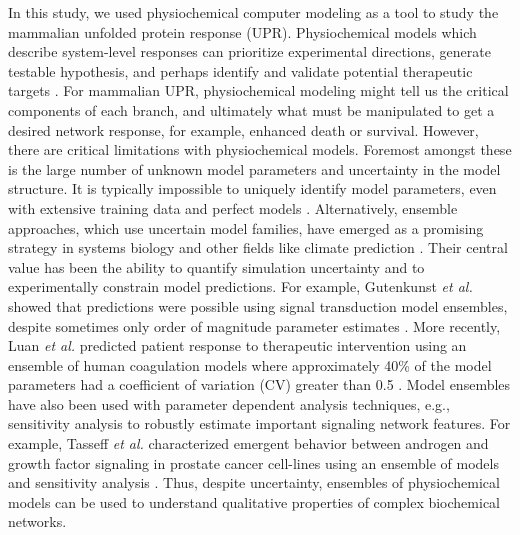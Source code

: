 \documentclass[fleqn,10pt]{wlscirep}
\begin{document}
In this study, we used physiochemical computer modeling as a tool to study the mammalian unfolded protein response (UPR).
Physiochemical models which describe system-level responses can prioritize experimental directions, generate testable hypothesis, and perhaps identify and validate potential therapeutic targets \cite{KITANO2007}.
For mammalian UPR, physiochemical modeling might tell us the critical components of each branch, and ultimately what must be manipulated to get a desired network response, for example, enhanced death or survival.
However, there are critical limitations with physiochemical models. Foremost amongst these is the large number of unknown model parameters and uncertainty in the model structure.
It is typically impossible to uniquely identify model parameters, even with extensive training data and perfect models \cite{Gadkar:2005ad}. Alternatively, ensemble approaches, which use uncertain model families, have emerged as a promising strategy in systems biology and other fields like climate prediction \cite{Battogtokh:2002uq,Kuepfer:2007,Brown:2003qy,Palmer:2005,Song:2009uq}.
Their central value has been the ability to quantify simulation uncertainty and to experimentally constrain model predictions. For example, Gutenkunst \emph{et al.} showed that predictions were possible using signal transduction model ensembles, despite sometimes only order of magnitude parameter estimates \cite{Gutenkunst:2007oq}.
More recently, Luan \emph{et al.} predicted patient response to therapeutic intervention using an ensemble of human coagulation models where approximately 40\% of the model parameters had a coefficient of variation (CV) greater than 0.5 \cite{Luan:2010fc}.
Model ensembles have also been used with parameter dependent analysis techniques, e.g., sensitivity analysis to robustly estimate important signaling network features.
For example, Tasseff \emph{et al.} characterized emergent behavior between androgen and growth factor signaling in prostate cancer cell-lines using an ensemble of models and sensitivity analysis \cite{Tasseff:2010rq}.
Thus, despite uncertainty, ensembles of physiochemical models can be used to understand qualitative properties of complex biochemical networks.
\end{document}

